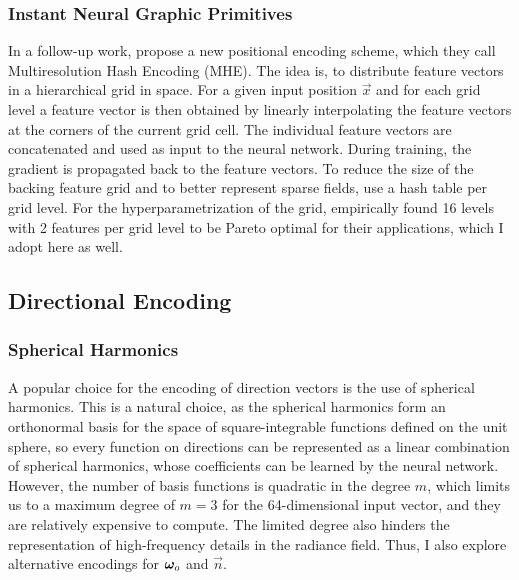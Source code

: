 \subsubsection{Instant Neural Graphic Primitives}
In a follow-up work, \textcite{muller2022} propose a new positional encoding scheme, which they call Multiresolution Hash Encoding (MHE).
The idea is, to distribute feature vectors in a hierarchical grid in space.
For a given input position $\vec{x}$ and for each grid level a feature vector is then obtained by linearly interpolating the feature vectors at the corners of the current grid cell.
The individual feature vectors are concatenated and used as input to the neural network.
During training, the gradient is propagated back to the feature vectors.
To reduce the size of the backing feature grid and to better represent sparse fields, \textcite{muller2022} use a hash table per grid level.
For the hyperparametrization of the grid, \textcite{muller2022} empirically found 16 levels with 2 features per grid level to be Pareto optimal for their applications, which I adopt here as well.


\subsection{Directional Encoding}

\subsubsection{Spherical Harmonics}
A popular choice for the encoding of direction vectors is the use of spherical harmonics.
This is a natural choice, as the spherical harmonics form an orthonormal basis for the space of square-integrable functions defined on the unit sphere, so every function on directions can be represented as a linear combination of spherical harmonics, whose coefficients can be learned by the neural network.
However, the number of basis functions is quadratic in the degree $m$, which limits us to a maximum degree of $m=3$ for the 64-dimensional input vector, and they are relatively expensive to compute.
The limited degree also hinders the representation of high-frequency details in the radiance field.
Thus, I also explore alternative encodings for $\bm{\omega}_o$ and $\vec{n}$.

